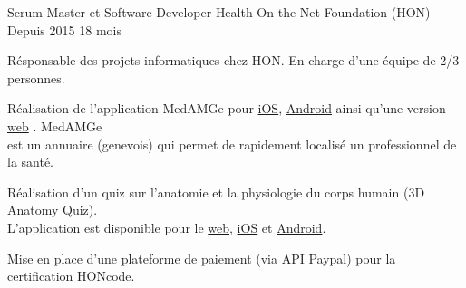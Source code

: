 
\begin{cventries}

  \cventry
    {Scrum Master et Software Developer}
    {Health On the Net Foundation (HON)}
    {Depuis 2015}
    {18 mois}
    {
      \begin{cvitems}
        \item{Résponsable des projets informatiques chez HON. En charge d'une
          équipe de 2/3 personnes.
        }
        \item{Réalisation de l'application MedAMGe pour
          {\color{awesome-skyblue}
            \href{https://itunes.apple.com/us/app/medamge/id469762154?mt=8}{iOS}},
          {\color{awesome-skyblue}
            \href{https://play.google.com/store/apps/details?id=org.healthonnet.medamge.android&hl=en}{Android}}
          ainsi qu'une version
          {\color{awesome-skyblue}
            \href{https://www.medamge.ch}{web}}
          . MedAMGe \\est un annuaire (genevois) qui permet de rapidement localisé
          un professionnel de la santé.
        }
        \item{Réalisation d'un quiz sur l'anatomie et la physiologie du corps
          humain (3D Anatomy Quiz). \\L'application est disponible pour le
          {\color{awesome-skyblue}
            \href{https://3danatomyquiz.kaahe.org}{web}},
          {\color{awesome-skyblue}
            \href{https://itunes.apple.com/us/app/t-rf-ly-jsdk/id1020122013?mt=8}{iOS}}
          et
          {\color{awesome-skyblue}
            \href{https://play.google.com/store/apps/details?id=org.kaahe.anatomyQuiz&hl=en}{Android}}.
        }
        \item{Mise en place d'une plateforme de paiement (via API Paypal)
          pour la certification HONcode.
        }
      \end{cvitems}
    }


\end{cventries}
